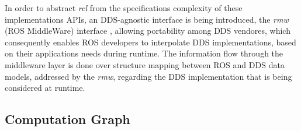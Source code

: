 In order to abstract \textit{rcl} from the specifications complexity of these implementations APIs, an DDS-agnostic interface is being introduced, the \textit{rmw} (ROS MiddleWare) interface \cite{casini2019response}, allowing portability among DDS vendores, which consequently enables ROS developers to interpolate DDS implementations, based on their applications needs during runtime. The information flow through the middleware layer is done over structure mapping between ROS and DDS data models, addressed by the \textit{rmw}, regarding the DDS implementation that is being considered at runtime.



\subsection{Computation Graph}

